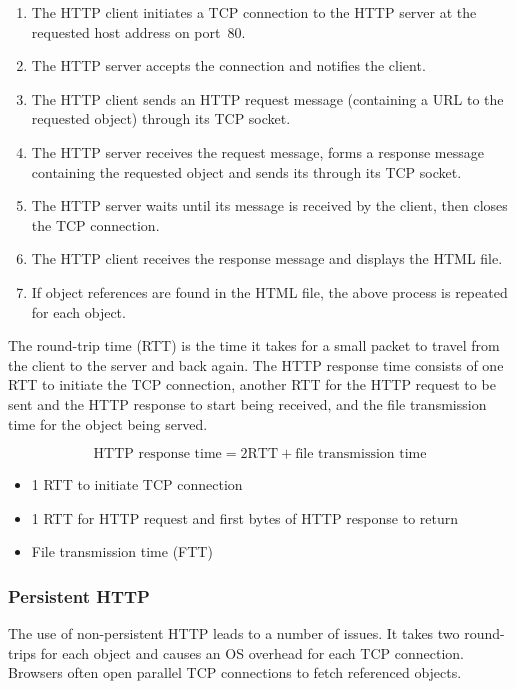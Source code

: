 \begin{enumerate}
  \item The HTTP client initiates a TCP connection to the HTTP server at the requested host address on port~\num{80}.
  \item The HTTP server accepts the connection and notifies the client.
  \item The HTTP client sends an HTTP request message (containing a URL to the requested object) through its TCP socket.
  \item The HTTP server receives the request message, forms a response message containing the requested object and sends its through its TCP socket.
  \item The HTTP server waits until its message is received by the client, then closes the TCP connection.
  \item The HTTP client receives the response message and displays the HTML file.
  \item If object references are found in the HTML file, the above process is repeated for each object.
\end{enumerate}

The round-trip time (RTT) is the time it takes for a small packet to travel from the client to the server and back again.
The HTTP response time consists of one RTT to initiate the TCP connection, another RTT for the HTTP request to be sent and the HTTP response to start being received, and the file transmission time for the object being served.

\begin{equation*}
  \text{HTTP response time} = 2 \text{RTT} + \text{file transmission time}
\end{equation*}
\begin{itemize}
  \item 1 RTT to initiate TCP connection
  \item 1 RTT for HTTP request and first bytes of HTTP response to return
  \item File transmission time (FTT)
\end{itemize}
\subsubsection{Persistent HTTP}

The use of non-persistent HTTP leads to a number of issues.
It takes two round-trips for each object and causes an OS overhead for each TCP connection.
Browsers often open parallel TCP connections to fetch referenced objects.

